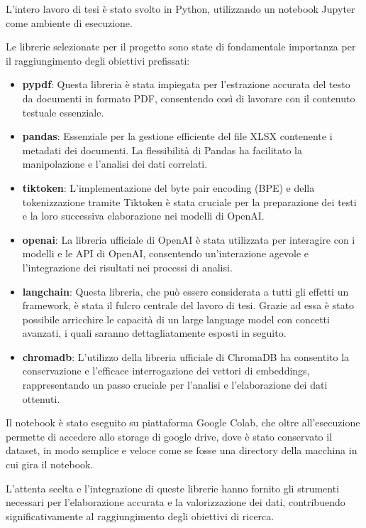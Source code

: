 L'intero lavoro di tesi è stato svolto in Python\cite{python}, utilizzando un notebook Jupyter\cite{jupyter} come ambiente di esecuzione.

Le librerie selezionate per il progetto sono state di fondamentale importanza per il raggiungimento degli obiettivi prefissati:
\begin{itemize}
    \item \textbf{pypdf}: Questa libreria è stata impiegata per l'estrazione accurata del testo da documenti in formato PDF, consentendo così di lavorare con il contenuto testuale essenziale.
    \item \textbf{pandas}: Essenziale per la gestione efficiente del file XLSX contenente i metadati dei documenti. La flessibilità di Pandas ha facilitato la manipolazione e l'analisi dei dati correlati.
    \item \textbf{tiktoken}: L'implementazione del byte pair encoding (BPE) e della tokenizzazione tramite Tiktoken è stata cruciale per la preparazione dei testi e la loro successiva elaborazione nei modelli di OpenAI. 
    \item \textbf{openai}: La libreria ufficiale di OpenAI è stata utilizzata per interagire con i modelli e le API di OpenAI, consentendo un'interazione agevole e l'integrazione dei risultati nei processi di analisi.
    \item \textbf{langchain}: Questa libreria, che può essere considerata a tutti gli effetti un framework, è stata il fulcro centrale del lavoro di tesi. Grazie ad essa è stato possibile arricchire le capacità di un large language model con concetti avanzati, i quali saranno dettagliatamente esposti in seguito.
    \item \textbf{chromadb}: L'utilizzo della libreria ufficiale di ChromaDB ha consentito la conservazione e l'efficace interrogazione dei vettori di embeddings, rappresentando un passo cruciale per l'analisi e l'elaborazione dei dati ottenuti.
\end{itemize}

Il notebook è stato eseguito su piattaforma Google Colab, che oltre all'esecuzione permette di accedere allo storage di google drive, dove è stato conservato il dataset, in modo semplice e veloce come se fosse una directory della macchina in cui gira il notebook.

L'attenta scelta e l'integrazione di queste librerie hanno fornito gli strumenti necessari per l'elaborazione accurata e la valorizzazione dei dati, contribuendo significativamente al raggiungimento degli obiettivi di ricerca.

